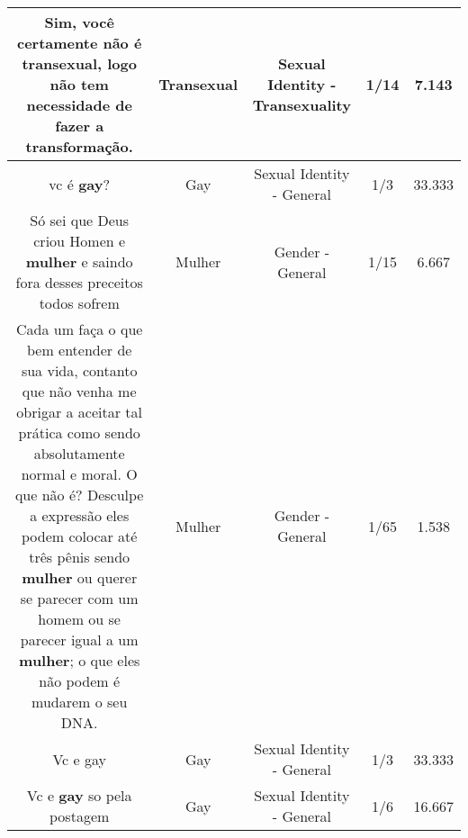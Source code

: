\documentclass[11pt]{article}
\newlength\mylength
\begin{document}
\begin{center}
\begin{longtable}{|C{.65\mylength}|C{.30\mylength}|C{.12\mylength}|C{.12\mylength}|C{.12\mylength}|}
  \small Sim,  você certamente não é  \textbf{transexual},   logo não tem necessidade de fazer a transformação.\normalsize   & Transexual & Sexual Identity - Transexuality & 1/14 & 7.143 \\  \hline
  \small vc é \textbf{gay}?\normalsize   & Gay & Sexual Identity - General & 1/3 & 33.333 \\  \hline
  \small Só sei que Deus criou Homen e \textbf{mulher} e saindo fora desses preceitos todos sofrem\normalsize   & Mulher & Gender - General & 1/15 & 6.667 \\  \hline
  \small Cada um faça o que bem entender de sua vida, contanto que não venha me obrigar a aceitar tal prática como sendo absolutamente normal e moral. O que não é? Desculpe a expressão eles podem colocar até três pênis sendo \textbf{mulher} ou querer se parecer  com um homem ou se parecer igual a um \textbf{mulher}; o que eles não podem é mudarem o seu DNA.\normalsize   & Mulher & Gender - General & 1/65 & 1.538 \\  \hline
  \small Vc e gay\normalsize   & Gay & Sexual Identity - General & 1/3 & 33.333 \\  \hline
  \small Vc e \textbf{gay} so pela postagem\normalsize   & Gay & Sexual Identity - General & 1/6 & 16.667 \\  \hline

\end{longtable}
\end{center}
\end{document}
